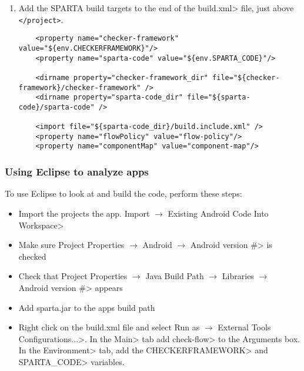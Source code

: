\begin{enumerate}
\item
Add the SPARTA build targets to the end of the \<build.xml>
 file, just above \verb|</project>|.


\begin{Verbatim}
    <property name="checker-framework" value="${env.CHECKERFRAMEWORK}"/>
    <property name="sparta-code" value="${env.SPARTA_CODE}"/>

    <dirname property="checker-framework_dir" file="${checker-framework}/checker-framework" />
    <dirname property="sparta-code_dir" file="${sparta-code}/sparta-code" />

    <import file="${sparta-code_dir}/build.include.xml" />
    <property name="flowPolicy" value="flow-policy"/>
    <property name="componentMap" value="component-map"/>
\end{Verbatim}

\end{enumerate}

\subsubsection{Using Eclipse to analyze apps}
To use Eclipse to look at and build the code, perform these 
steps:
\begin{itemize}
\item
Import the projects the app.      \<Import $\rightarrow$ Existing Android Code 
Into Workspace>

    \item
    Make sure
    \<Project Properties $\rightarrow$ Android $\rightarrow$ Android
    version \#> is checked

    \item
    Check that
    \<Project Properties $\rightarrow$ Java Build Path $\rightarrow$
    Libraries $\rightarrow$ Android version \#> appears

    \item
    Add sparta.jar to the apps build path
    
    \item Right click on the build.xml file and select   \<Run as $\rightarrow$ 
    External Tools Configurations...>. In the \<Main> tab add \<check-flow> to the 
    Arguments box.  In the \<Environment> tab, add the \<CHECKERFRAMEWORK> and 
    \<SPARTA\_CODE> variables.  
    
  \end{itemize}






